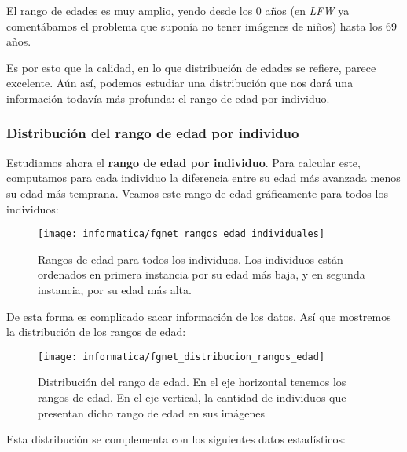El rango de edades es muy amplio, yendo desde los 0 años (en \textit{LFW} ya comentábamos el problema que suponía no tener imágenes de niños) hasta los 69 años.

Es por esto que la calidad, en lo que distribución de edades se refiere, parece excelente. Aún así, podemos estudiar una distribución que nos dará una información todavía más profunda: el rango de edad por individuo.

\subsubsection{Distribución del rango de edad por individuo} \label{isubsubs:fgnet_rango_edades}

Estudiamos ahora el \textbf{rango de edad por individuo}. Para calcular este, computamos para cada individuo la diferencia entre su edad más avanzada menos su edad más temprana. Veamos este rango de edad gráficamente para todos los individuos:

\begin{figure}[H]
    \centering
    \texttt{[image: informatica/fgnet\_rangos\_edad\_individuales]}
    \caption{Rangos de edad para todos los individuos. Los individuos están ordenados en primera instancia por su edad más baja, y en segunda instancia, por su edad más alta.}
    \label{img:fgnet_rangos_individuales}
\end{figure}

De esta forma es complicado sacar información de los datos. Así que mostremos la distribución de los rangos de edad:

\begin{figure}[H]
    \centering
    \texttt{[image: informatica/fgnet\_distribucion\_rangos\_edad]}
    \caption{Distribución del rango de edad. En el eje horizontal tenemos los rangos de edad. En el eje vertical, la cantidad de individuos que presentan dicho rango de edad en sus imágenes}
    \label{img:fgnet_rangos_distribucion}
\end{figure}

Esta distribución se complementa con los siguientes datos estadísticos:

